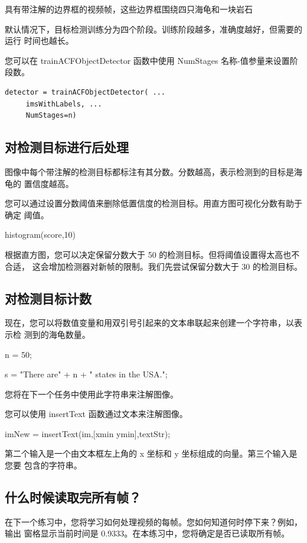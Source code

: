 \documentclass[12pt,a4paper]{article}
\begin{document}
具有带注解的边界框的视频帧，这些边界框围绕四只海龟和一块岩石

默认情况下，目标检测训练分为四个阶段。训练阶段越多，准确度越好，但需要的运行
时间也越长。

您可以在 trainACFObjectDetector 函数中使用 NumStages 名称-值参量来设置阶段数。

\begin{lstlisting}
detector = trainACFObjectDetector( ...
     imsWithLabels, ...
     NumStages=n)
\end{lstlisting}

\subsection{对检测目标进行后处理}

图像中每个带注解的检测目标都标注有其分数。分数越高，表示检测到的目标是海龟的
置信度越高。

您可以通过设置分数阈值来删除低置信度的检测目标。用直方图可视化分数有助于确定
阈值。

histogram(score,10)

根据直方图，您可以决定保留分数大于 50 的检测目标。但将阈值设置得太高也不合适，
这会增加检测器对新帧的限制。我们先尝试保留分数大于 30 的检测目标。

\subsection{对检测目标计数}

现在，您可以将数值变量和用双引号引起来的文本串联起来创建一个字符串，以表示检
测到的海龟数量。

n = 50;

s = "There are" + n + " states in the USA.";

您将在下一个任务中使用此字符串来注解图像。

您可以使用 insertText 函数通过文本来注解图像。

imNew = insertText(im,[xmin ymin],textStr);

第二个输入是一个由文本框左上角的 x 坐标和 y 坐标组成的向量。第三个输入是您要
包含的字符串。

\subsection{什么时候读取完所有帧？}

在下一个练习中，您将学习如何处理视频的每帧。您如何知道何时停下来？例如，输出
窗格显示当前时间是 0.9333。在本练习中，您将确定是否已读取所有帧。
\end{document}
